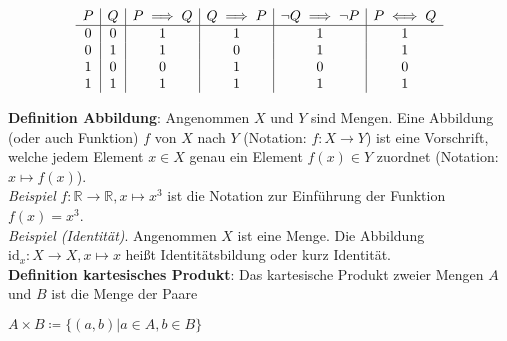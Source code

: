 \documentclass{article}
\begin{document}
\begin{displaymath}
  \begin{array}{ c | c | c | c | c | c}
    P & Q & P \implies Q & Q \implies P & \neg Q \implies \neg P & P \iff Q \\
    \hline
    0 & 0 & 1 & 1 & 1 & 1 \\
    0 & 1 & 1 & 0 & 1 & 1 \\
    1 & 0 & 0 & 1 & 0 & 0 \\
    1 & 1 & 1 & 1 & 1 & 1 \\
  \end{array}
\end{displaymath}

\textbf{Definition Abbildung}: Angenommen $X$ und $Y$ sind Mengen. Eine Abbildung (oder auch Funktion) $f$
von $X$ nach $Y$ (Notation: $f: X \to Y$) ist eine Vorschrift, welche jedem Element $x \in X$ genau ein
Element $f(x) \in Y$ zuordnet (Notation: $x \mapsto f(x)$). \\

\emph{Beispiel} $f: \mathbb{R} \to \mathbb{R}, x \mapsto x^{3}$ ist die Notation zur Einführung der Funktion
$f(x) = x^{3}$. \\

\emph{Beispiel (Identität)}. Angenommen $X$ ist eine Menge. Die Abbildung $\text{id}_{x}: X \to X, x \mapsto x$
heißt Identitätsbildung oder kurz Identität. \\

\textbf{Definition kartesisches Produkt}: Das kartesische Produkt zweier Mengen $A$ und $B$ ist die Menge der
Paare

$A \times B \coloneqq \{(a,b) | a \in A, b \in B\}$

\end{document}
